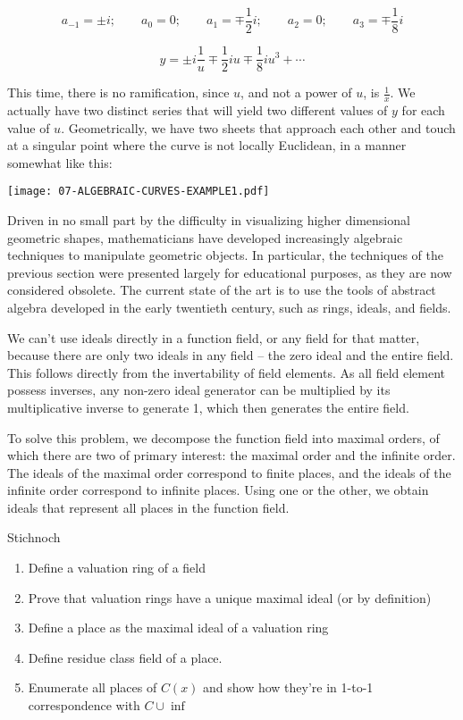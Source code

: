 $$a_{-1} = \pm i; \qquad a_0 = 0; \qquad a_1 = \mp \frac{1}{2}i; \qquad a_2 = 0; \qquad a_3 = \mp \frac{1}{8}i$$

$$y = \pm i \frac{1}{u} \mp \frac{1}{2} i u \mp \frac{1}{8} i u^3 + \cdots$$

This time, there is no ramification, since $u$, and not a power of
$u$, is $\frac{1}{x}$.  We actually have two distinct series that will
yield two different values of $y$ for each value of $u$.
Geometrically, we have two sheets that approach each other and touch
at a singular point where the curve is not locally Euclidean,
in a manner somewhat like this:

\begin{center}
\texttt{[image: 07-ALGEBRAIC-CURVES-EXAMPLE1.pdf]}
\end{center}

\endexample

\vfill\eject
{}

Driven in no small part by the difficulty in visualizing higher dimensional geometric shapes,
mathematicians have developed increasingly algebraic techniques to manipulate geometric objects.
In particular, the techniques of the previous section were presented largely for educational purposes,
as they are now considered obsolete.
The current state of the art is to use the tools of abstract algebra developed in the early
twentieth century, such as rings, ideals, and fields.

We can't use ideals directly in a function field, or any field for that matter, because
there are only two ideals in any field -- the zero ideal and the entire field.  This
follows directly from the invertability of field elements.  As all field element possess
inverses, any non-zero ideal generator can be multiplied by its multiplicative inverse
to generate 1, which then generates the entire field.

To solve this problem, we decompose the function field into maximal orders, of which
there are two of primary interest: the maximal order and the infinite order.
The ideals of the maximal order correspond to
finite places, and the ideals of the infinite order correspond to infinite places.
Using one or the other, we obtain ideals that represent all places in the function field.

Stichnoch

\begin{enumerate}
\item Define a valuation ring of a field
\item Prove that valuation rings have a unique maximal ideal (or by definition)
\item Define a place as the maximal ideal of a valuation ring
\item Define residue class field of a place.
\item Enumerate all places of $C(x)$ and show how they're in 1-to-1 correspondence with $C \cup \inf$
\end{enumerate}

